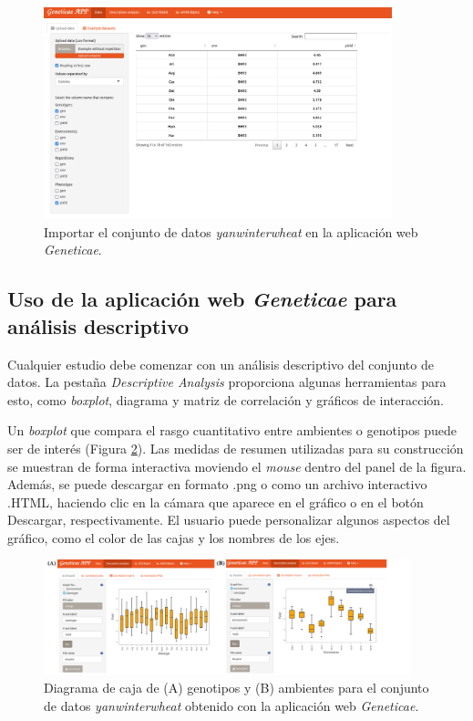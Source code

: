  \begin{figure}[h]
	\begin{center}
		\includegraphics[width=0.9\textwidth]{./Graficos/www/Data.png}
	\end{center}
	\caption{Importar el conjunto de datos \emph{yanwinterwheat} en la aplicación web \emph{Geneticae}.}
	\label{fig:fig431}
\end{figure}

\hspace{1cm}

\subsection{Uso de la aplicación web \emph{Geneticae} para análisis descriptivo}

Cualquier estudio debe comenzar con un análisis descriptivo del conjunto de datos. La pestaña \emph{Descriptive Analysis} proporciona algunas herramientas para esto, como  \emph{boxplot}, diagrama y matriz de correlación y gráficos de interacción.

Un \emph{boxplot} que compara el rasgo cuantitativo entre ambientes o genotipos puede ser de interés (Figura \ref{fig:figdesc1}). Las medidas de resumen utilizadas para su construcción se muestran de forma interactiva moviendo el \emph{mouse} dentro del panel de la figura. Además, se puede descargar en formato .png o como un archivo interactivo .HTML, haciendo clic en la cámara que aparece en el gráfico o en el botón Descargar, respectivamente. El usuario puede personalizar algunos aspectos del gráfico, como el color de las cajas y los nombres de los ejes. 

\begin{figure}[h]
	\begin{center}
		\includegraphics[width=0.95\textwidth]{./Graficos/www/boxplot.png}
	\end{center}
	\caption{Diagrama de caja de (A) genotipos y (B) ambientes para el conjunto de datos \emph{yanwinterwheat} obtenido con la aplicación web \emph{Geneticae}.}
	\label{fig:figdesc1}
\end{figure}


